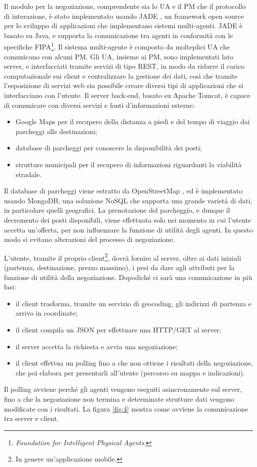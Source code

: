 \documentclass[11pt,a4paper,twoside]{article}
\numberwithin{figure}{section}
\numberwithin{equation}{section}
\begin{document}
Il modulo per la negoziazione, comprendente sia lo UA e il PM che il protocollo di interazione, è stato implementato usando JADE \cite{11}, un framework open source per lo sviluppo di applicazioni che implementano sistemi multi-agenti. JADE è basato su Java, e supporta la comunicazione tra agenti in conformità con le specifiche FIPA\footnote{\emph{Foundation for Intelligent Physical Agents}.}. Il sistema multi-agente è composto da molteplici UA che comunicano con alcuni PM. Gli UA, insieme ai PM, sono implementati lato server, e interfacciati tramite servizi di tipo REST, in modo da ridurre il carico computazionale sui client e centralizzare la gestione dei dati, così che tramite l'esposizione di servizi web sia possibile creare diversi tipi di applicazioni che si interfacciano con l'utente. Il server back-end, basato su Apache Tomcat, è capace di comunicare con diversi servizi e fonti d'informazioni esterne:
\begin{itemize}
    \item Google Maps \cite{12} per il recupero della distanza a piedi e del tempo di viaggio dai parcheggi alle destinazioni;
    \item database di parcheggi per conoscere la disponibilità dei posti;
    \item strutture municipali per il recupero di informazioni riguardanti la viabilità stradale.
\end{itemize}
Il database di parcheggi viene estratto da OpenStreetMap \cite{13}, ed è implementato usando MongoDB, una soluzione NoSQL che supporta una grande varietà di dati, in particolare quelli geografici.
La prenotazione del parcheggio, e dunque il decremento dei posti disponibili, viene effettuata solo nei momento in cui l'utente accetta un'offerta, per non influenzare la funzione di utilità degli agenti. In questo modo si evitano alterazioni del processo di negoziazione.

L'utente, tramite il proprio client\footnote{In genere un'applicazione mobile.}, dovrà fornire al server, oltre ai dati iniziali (partenza, destinazione, prezzo massimo), i pesi da dare agli attributi per la funzione di utilità della negoziazione.
Dopodiché ci sarà una comunicazione in più fasi:
\begin{itemize}
    \item il client trasforma, tramite un servizio di geocoding, gli indirizzi di partenza e arrivo in coordinate;
    \item il client compila un JSON per effettuare una HTTP/GET al server;
    \item il server accetta la richiesta e avvia una negoziazione;
    \item il client effettua un polling fino a che non ottiene i risultati della negoziazione, che poi elabora per presentarli all'utente (percorso su mappa e indicazioni).
\end{itemize}
Il polling avviene perché gli agenti vengono eseguiti asincronamente sul server, fino a che la negoziazione non termina e determinate strutture dati vengono modificate con i risultati.
La figura \ref{fig:4} mostra come avviene la comunicazione tra server e client.
\end{document}
